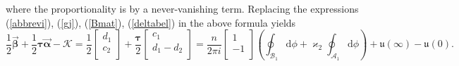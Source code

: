 \documentclass[10pt,oneside,reqno]{amsart}
\numberwithin{equation}{section}
\renewcommand{\d}{{\mathrm d}}
\def\eqref#1{(\ref{#1})}
\begin{document}
where the proportionality is by a never-vanishing term.
Replacing the expressions \eqref{abbrevi}, \eqref{gj}, \eqref{Bmat}, \eqref{deltabel} in the above formula yields
\begin{equation*}
  \frac{1}{2}\vec{\boldsymbol \beta}+\frac{1}{2}{\boldsymbol \tau}\vec{\boldsymbol \alpha} -\mathcal{K}=\frac{1}{2}\begin{bmatrix}
                                                                              d_1\\
c_2\\
                                                                             \end{bmatrix}+\frac{{\boldsymbol \tau}}{2}\begin{bmatrix}
c_1\\
d_1-d_2\\
\end{bmatrix} = \frac{n}{2\pi i}\begin{bmatrix}
1\\
-1\\
\end{bmatrix}\left(\oint_{\mathcal{B}_1}\d\phi+\varkappa_2\oint_{\mathcal{A}_1}\d\phi\right)+\mathfrak{u}(\infty)-\mathfrak{u}(0).
\end{equation*}
\end{document}
